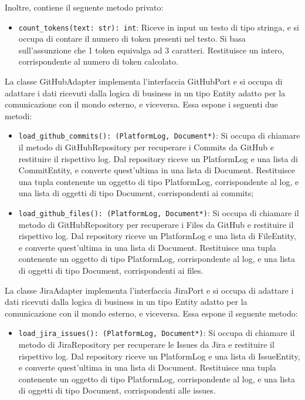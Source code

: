 Inoltre, contiene il seguente metodo privato:
\begin{itemize}
    \item \texttt{count\_tokens(text: str): int}: Riceve in input un testo di tipo stringa, e si occupa di contare il numero di token presenti nel testo. Si basa sull'assunzione che 1 token equivalga ad 3 caratteri. Restituisce un intero, corrispondente al numero di token calcolato.
\end{itemize}

\label{sec:github_adapter}
La classe GitHubAdapter implementa l'interfaccia GitHubPort e si occupa di adattare i dati ricevuti dalla logica di business in un tipo Entity adatto per la comunicazione con il mondo esterno, e viceversa. Essa espone i seguenti due metodi:
\begin{itemize}
    \item \texttt{load\_github\_commits(): (PlatformLog, Document*)}: Si occupa di chiamare il metodo di GitHubRepository per recuperare i Commits da GitHub e restituire il rispettivo log. Dal repository riceve un PlatformLog e una lista di CommitEntity, e converte quest'ultima in una lista di Document. Restituisce una tupla contenente un oggetto di tipo PlatformLog, corrispondente al log, e una lista di oggetti di tipo Document, corrispondenti ai commits;
    \item \texttt{load\_github\_files(): (PlatformLog, Document*)}: Si occupa di chiamare il metodo di GitHubRepository per recuperare i Files da GitHub e restituire il rispettivo log. Dal repository riceve un PlatformLog e una lista di FileEntity, e converte quest'ultima in una lista di Document. Restituisce una tupla contenente un oggetto di tipo PlatformLog, corrispondente al log, e una lista di oggetti di tipo Document, corrispondenti ai files.
\end{itemize}

\label{sec:jira_adapter}
La classe JiraAdapter implementa l'interfaccia JiraPort e si occupa di adattare i dati ricevuti dalla logica di business in un tipo Entity adatto per la comunicazione con il mondo esterno, e viceversa. Essa espone il seguente metodo:
\begin{itemize}
    \item \texttt{load\_jira\_issues(): (PlatformLog, Document*)}: Si occupa di chiamare il metodo di JiraRepository per recuperare le Issues da Jira e restituire il rispettivo log. Dal repository riceve un PlatformLog e una lista di IssueEntity, e converte quest'ultima in una lista di Document. Restituisce una tupla contenente un oggetto di tipo PlatformLog, corrispondente al log, e una lista di oggetti di tipo Document, corrispondenti alle issues.
\end{itemize}

